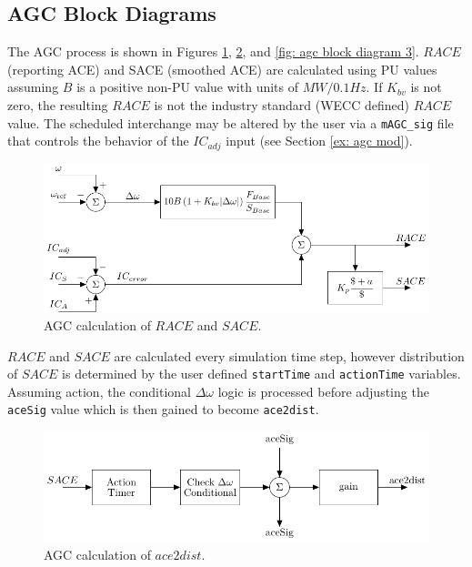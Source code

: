 \subsection{AGC Block Diagrams}
The AGC process is shown in Figures \ref{fig: agc block diagram 1}, \ref{fig: agc block diagram 2}, and \ref{fig: agc block diagram 3}.
$RACE$ (reporting ACE) and SACE (smoothed ACE) are calculated using PU values assuming $B$ is a positive non-PU value with units of $MW/0.1Hz$.
If $K_{bv}$ is not zero, the resulting $RACE$ is not the industry standard (WECC defined) $RACE$ value.
The scheduled interchange may be altered by the user via a \verb|mAGC_sig| file that controls the behavior of the $IC_{adj}$ input (see Section \ref{ex: agc mod}).

\begin{figure}[!h]
	\centering
	\footnotesize
	\includegraphics[width=\linewidth]{sections/agc/200722-AGCblockdiagram-p1}
	\caption{AGC calculation of $RACE$ and $SACE$.}
	\label{fig: agc block diagram 1}
\end{figure}%

\pagebreak
$RACE$ and $SACE$ are calculated every simulation time step, however
distribution of $SACE$ is determined by the user defined \verb|startTime| and \verb|actionTime| variables.
Assuming action, the conditional $\Delta\omega$ logic is processed before adjusting the \verb|aceSig| value which is then gained to become \verb|ace2dist|.

\begin{figure}[!h]
	\centering
	\footnotesize
	\includegraphics[width=\linewidth]{sections/agc/200722-AGCblockdiagram-p2}
	\caption{AGC calculation of $ace2dist$.}
	\label{fig: agc block diagram 2}
\end{figure}%

